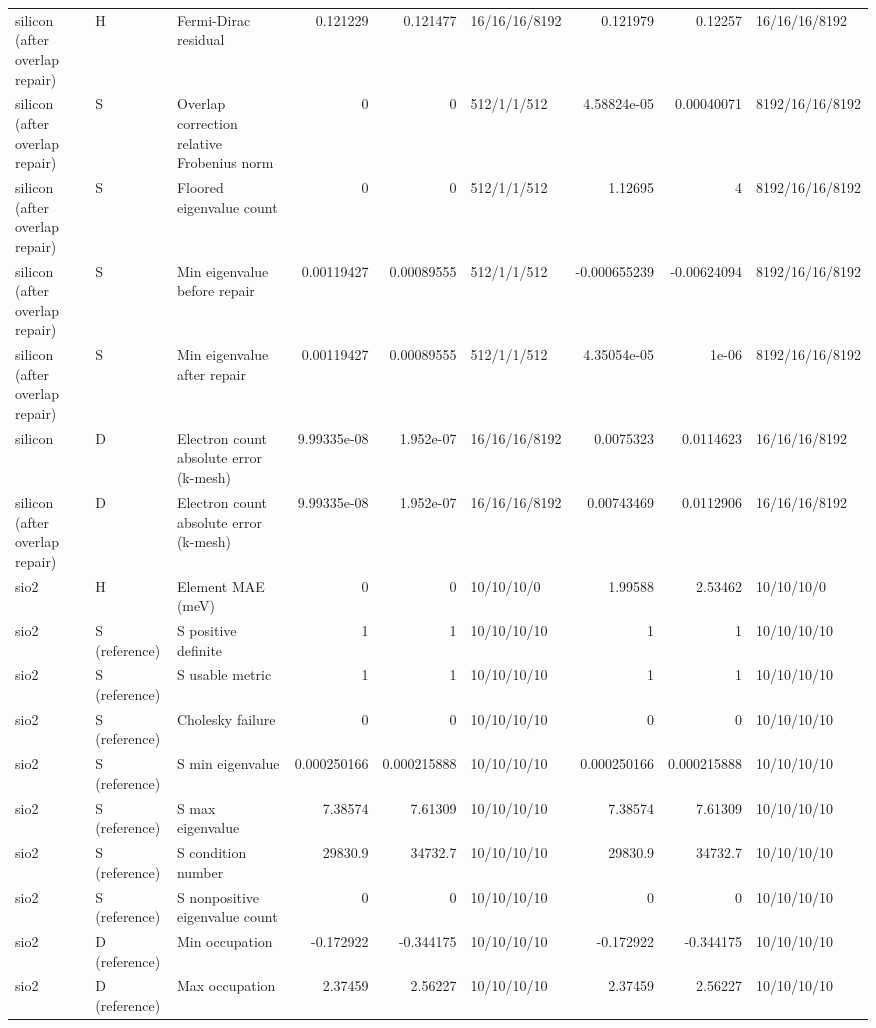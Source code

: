 \begin{tabular}{lllrrlrrl}
silicon (after overlap repair) & H & Fermi-Dirac residual & 0.121229 & 0.121477 & 16/16/16/8192 & 0.121979 & 0.12257 & 16/16/16/8192 \\
silicon (after overlap repair) & S & Overlap correction relative Frobenius norm & 0 & 0 & 512/1/1/512 & 4.58824e-05 & 0.00040071 & 8192/16/16/8192 \\
silicon (after overlap repair) & S & Floored eigenvalue count & 0 & 0 & 512/1/1/512 & 1.12695 & 4 & 8192/16/16/8192 \\
silicon (after overlap repair) & S & Min eigenvalue before repair & 0.00119427 & 0.00089555 & 512/1/1/512 & -0.000655239 & -0.00624094 & 8192/16/16/8192 \\
silicon (after overlap repair) & S & Min eigenvalue after repair & 0.00119427 & 0.00089555 & 512/1/1/512 & 4.35054e-05 & 1e-06 & 8192/16/16/8192 \\
silicon & D & Electron count absolute error (k-mesh) & 9.99335e-08 & 1.952e-07 & 16/16/16/8192 & 0.0075323 & 0.0114623 & 16/16/16/8192 \\
silicon (after overlap repair) & D & Electron count absolute error (k-mesh) & 9.99335e-08 & 1.952e-07 & 16/16/16/8192 & 0.00743469 & 0.0112906 & 16/16/16/8192 \\
sio2 & H & Element MAE (meV) & 0 & 0 & 10/10/10/0 & 1.99588 & 2.53462 & 10/10/10/0 \\
sio2 & S (reference) & S positive definite & 1 & 1 & 10/10/10/10 & 1 & 1 & 10/10/10/10 \\
sio2 & S (reference) & S usable metric & 1 & 1 & 10/10/10/10 & 1 & 1 & 10/10/10/10 \\
sio2 & S (reference) & Cholesky failure & 0 & 0 & 10/10/10/10 & 0 & 0 & 10/10/10/10 \\
sio2 & S (reference) & S min eigenvalue & 0.000250166 & 0.000215888 & 10/10/10/10 & 0.000250166 & 0.000215888 & 10/10/10/10 \\
sio2 & S (reference) & S max eigenvalue & 7.38574 & 7.61309 & 10/10/10/10 & 7.38574 & 7.61309 & 10/10/10/10 \\
sio2 & S (reference) & S condition number & 29830.9 & 34732.7 & 10/10/10/10 & 29830.9 & 34732.7 & 10/10/10/10 \\
sio2 & S (reference) & S nonpositive eigenvalue count & 0 & 0 & 10/10/10/10 & 0 & 0 & 10/10/10/10 \\
sio2 & D (reference) & Min occupation & -0.172922 & -0.344175 & 10/10/10/10 & -0.172922 & -0.344175 & 10/10/10/10 \\
sio2 & D (reference) & Max occupation & 2.37459 & 2.56227 & 10/10/10/10 & 2.37459 & 2.56227 & 10/10/10/10 \\

\end{tabular}
